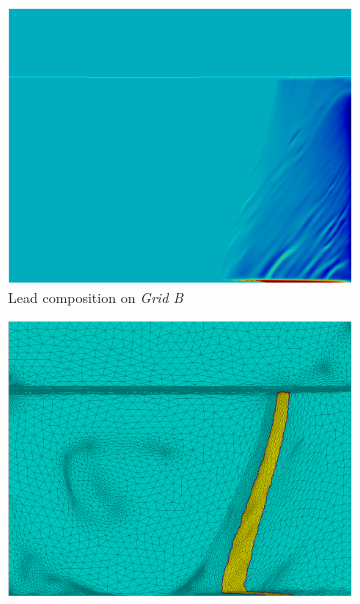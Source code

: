 \begin{figure}[H]
\begin{subfigure}[t]{0.15\textwidth}
  \end{subfigure}
  \begin{subfigure}[t]{0.4\textwidth}
    \centering
  \includegraphics[width=\textwidth]{Chapter5/Graphics/2d/1200s_compobis.png}
  \caption{Lead composition on \emph{Grid B}}
    \label{fig:1200s_compobis}
  \end{subfigure}
   \vspace{5mm}
  \begin{subfigure}[t]{0.4\textwidth}
    \centering
  \includegraphics[width=\textwidth]{Chapter5/Graphics/2d/1200s_unmask.png}

\end{subfigure}
\end{figure}
